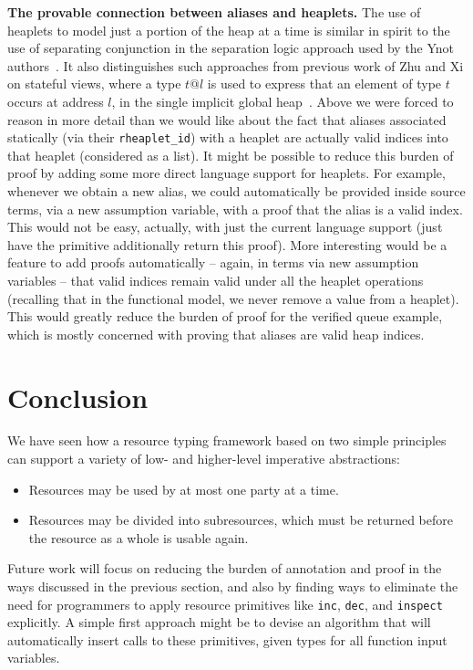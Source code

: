\documentclass[9pt,natbib]{sigplanconf}
\begin{document}
\textbf{The provable connection between aliases and heaplets.} The use
of heaplets to model just a portion of the heap at a time is similar
in spirit to the use of separating conjunction in the separation logic
approach used by the Ynot authors~\cite{nanevski+08,reynolds02}.  It
also distinguishes such approaches from previous work of Zhu and Xi on
stateful views, where a type $t@l$ is used to express that an element
of type $t$ occurs at address $l$, in the single implicit global
heap~\cite{zhu+05}.  Above we were forced to reason in more detail
than we would like about the fact that aliases associated statically
(via their \texttt{rheaplet\_id}) with a heaplet are actually valid
indices into that heaplet (considered as a list).  It might be
possible to reduce this burden of proof by adding some more direct
language support for heaplets.  For example, whenever we obtain a new
alias, we could automatically be provided inside source terms, via a
new assumption variable, with a proof that the alias is a valid index.
This would not be easy, actually, with just the current language
support (just have the primitive additionally return this proof).
More interesting would be a feature to add proofs automatically --
again, in terms via new assumption variables -- that valid indices
remain valid under all the heaplet operations (recalling that in the
functional model, we never remove a value from a heaplet).  This would
greatly reduce the burden of proof for the verified queue example,
which is mostly concerned with proving that aliases are valid heap
indices.

\section{Conclusion}

We have seen how a resource typing framework based on two simple
principles can support a variety of low- and higher-level imperative
abstractions:

\begin{itemize}
\item Resources may be used by at most one party at a time.
\item Resources may be divided into subresources, which must be
  returned before the resource as a whole is usable again.
\end{itemize}

\noindent Future work will focus on reducing the burden of annotation
and proof in the ways discussed in the previous section, and also by
finding ways to eliminate the need for programmers to apply resource
primitives like \texttt{inc}, \texttt{dec}, and \texttt{inspect}
explicitly.  A simple first approach might be to devise an algorithm
that will automatically insert calls to these primitives, given types
for all function input variables.  
\end{document}
